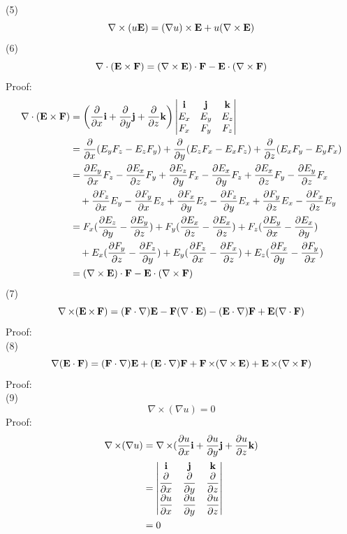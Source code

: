 \documentclass[UTF8]{ctexart} %
\DeclareMathOperator{\ti}{\times}
\newcommand{\dis}{\displaystyle}
\numberwithin{equation}{section}
\begin{document}
(5) \begin{equation}\label{key}
\nabla\times(u\vb{E})=(\nabla u)\times\vb{E}+u(\nabla\times\vb{E})
\end{equation}
(6) \begin{equation}\label{key}
\nabla\cdot(\vb{E}\times\vb{F})=(\nabla\times\vb{E})\cdot\vb{F}-\vb{E}\cdot(\nabla\times\vb{F})
\end{equation}
Proof:
\begin{equation}\begin{aligned}
\nabla\cdot(\vb{E}\times\vb{F}) &=\qty(\pdv{x}\vb{i}+\pdv{y}\vb{j}+\pdv{z}\vb{k})\mdet{\vb{i} & \vb{j} & \vb{k}\\
	E_x & E_y & E_z\\
	F_x & F_y & F_z}\\
&=\pdv{x}(E_y F_z - E_z F_y)+\pdv{y}(E_z F_x - E_x F_z)+\pdv{z}(E_x F_y - E_y F_x)\\
& =\pdv{E_y}{x}F_z - \pdv{E_x}{z}F_y + \pdv{E_z}{y}F_x -\pdv{E_x}{y}F_z + \pdv{E_x}{z}F_y - \pdv{E_y}{z}F_x \\
&\quad + \pdv{F_z}{x}E_y -\pdv{F_y}{x}E_z + \pdv{F_x}{y}E_z -\pdv{F_z}{y}E_x + \pdv{F_y}{z}E_x - \pdv{F_x}{z}E_y\\
&=F_x(\pdv{E_z}{y} - \pdv{E_y}{z})+F_y(\pdv{E_x}{z} - \pdv{E_x}{z})+F_z(\pdv{E_y}{x} -\pdv{E_x}{y})\\
&\quad +E_x(\pdv{F_y}{z} -\pdv{F_z}{y})+E_y(\pdv{F_z}{x} - \pdv{F_x}{z})+E_z(\pdv{F_x}{y} -\pdv{F_y}{x})\\
&=(\nabla\times\vb{E})\cdot\vb{F}-\vb{E}\cdot(\nabla\times\vb{F})
\end{aligned}\end{equation}
(7) \begin{equation}\label{key}
\nabla\ti(\vb{E}\ti\vb{F})=(\vb{F}\cdot\nabla)\vb{E}-\vb{F}(\nabla\cdot\vb{E})-(\vb{E}\cdot\nabla)\vb{F}+\vb{E}(\nabla\cdot\vb{F})
\end{equation}
Proof:\\
(8) \begin{equation}\label{key}
\nabla (\vb{E}\cdot\vb{F}) = (\vb{F}\cdot\nabla)\vb{E}+(\vb{E}\cdot\nabla)\vb{F}+\vb{F}\ti(\nabla\ti\vb{E})+\vb{E}\ti(\nabla\ti\vb{F})
\end{equation}
Proof:\\
(9) \begin{equation}\label{key}
\nabla\ti(\nabla u)=0
\end{equation}
Proof:
\begin{equation}\label{key}
\begin{aligned}
\nabla\ti(\nabla u)
& =\nabla\ti(\pdv{u}{x}\vb{i}+\pdv{u}{y}\vb{j}+\pdv{u}{z}\vb{k})\\
& =\mdet{\vb{i} & \vb{j} & \vb{k}\\
	\dis\pdv{x} & \dis\pdv{y} & \dis\pdv{z}\\
	\dis\pdv{u}{x} & \dis\pdv{u}{y} & \dis\pdv{u}{z}}\\
& = 0
\end{aligned}
\end{equation}
\end{document}
